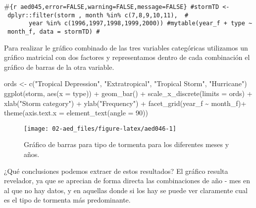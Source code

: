 \documentclass[
]{book}
\newenvironment{Shaded}{\begin{snugshade}}{\end{snugshade}}
\newcommand{\AttributeTok}[1]{\textcolor[rgb]{0.77,0.63,0.00}{#1}}
\newcommand{\DecValTok}[1]{\textcolor[rgb]{0.00,0.00,0.81}{#1}}
\newcommand{\FunctionTok}[1]{\textcolor[rgb]{0.00,0.00,0.00}{#1}}
\newcommand{\NormalTok}[1]{#1}
\newcommand{\OtherTok}[1]{\textcolor[rgb]{0.56,0.35,0.01}{#1}}
\newcommand{\SpecialCharTok}[1]{\textcolor[rgb]{0.00,0.00,0.00}{#1}}
\newcommand{\StringTok}[1]{\textcolor[rgb]{0.31,0.60,0.02}{#1}}
\begin{document}
\#\texttt{\{r\ aed045,error=FALSE,warning=FALSE,message=FALSE\}\ \#stormTD\ \textless{}-\ dplyr::filter(storm\ ,\ month\ \%in\%\ c(7,8,9,10,11),\ \ \#\ \ \ \ \ \ \ \ \ \ \ \ \ \ \ \ \ \ \ \ \ \ \ \ \ year\ \%in\%\ c(1996,1997,1998,1999,2000))\ \#mytable(year\_f\ +\ type\ \textasciitilde{}\ month\_f,\ data\ =\ stormTD)\ \#}

Para realizar le gráfico combinado de las tres variables categóricas utilizamos un gráfico matricial con dos factores y representamos dentro de cada combinación el gráfico de barras de la otra variable.

\begin{Shaded}
\begin{Highlighting}[]
\NormalTok{ords }\OtherTok{\textless{}{-}} \FunctionTok{c}\NormalTok{(}\StringTok{"Tropical Depression"}\NormalTok{, }\StringTok{"Extratropical"}\NormalTok{, }\StringTok{"Tropical Storm"}\NormalTok{, }\StringTok{"Hurricane"}\NormalTok{)}
\FunctionTok{ggplot}\NormalTok{(storm, }\FunctionTok{aes}\NormalTok{(}\AttributeTok{x =}\NormalTok{ type))  }\SpecialCharTok{+}
  \FunctionTok{geom\_bar}\NormalTok{() }\SpecialCharTok{+} 
  \FunctionTok{scale\_x\_discrete}\NormalTok{(}\AttributeTok{limits =}\NormalTok{ ords) }\SpecialCharTok{+}
  \FunctionTok{xlab}\NormalTok{(}\StringTok{"Storm category"}\NormalTok{) }\SpecialCharTok{+}
  \FunctionTok{ylab}\NormalTok{(}\StringTok{"Frequency"}\NormalTok{) }\SpecialCharTok{+}
  \FunctionTok{facet\_grid}\NormalTok{(year\_f }\SpecialCharTok{\textasciitilde{}}\NormalTok{ month\_f)}\SpecialCharTok{+}
  \FunctionTok{theme}\NormalTok{(}\AttributeTok{axis.text.x =} \FunctionTok{element\_text}\NormalTok{(}\AttributeTok{angle =} \DecValTok{90}\NormalTok{)) }
\end{Highlighting}
\end{Shaded}

\begin{figure}

{\centering \texttt{[image: 02-aed\_files/figure-latex/aed046-1]} 

}

\caption{Gráfico de barras para tipo de tormenta para los diferentes meses y años.}\label{fig:aed046}
\end{figure}

¿Qué conclusiones podemos extraer de estos resultados? El gráfico resulta revelador, ya que se aprecian de forma directa las combinaciones de año - mes en al que no hay datos, y en aquellas donde si los hay se puede ver claramente cual es el tipo de tormenta más predominante.
\end{document}
